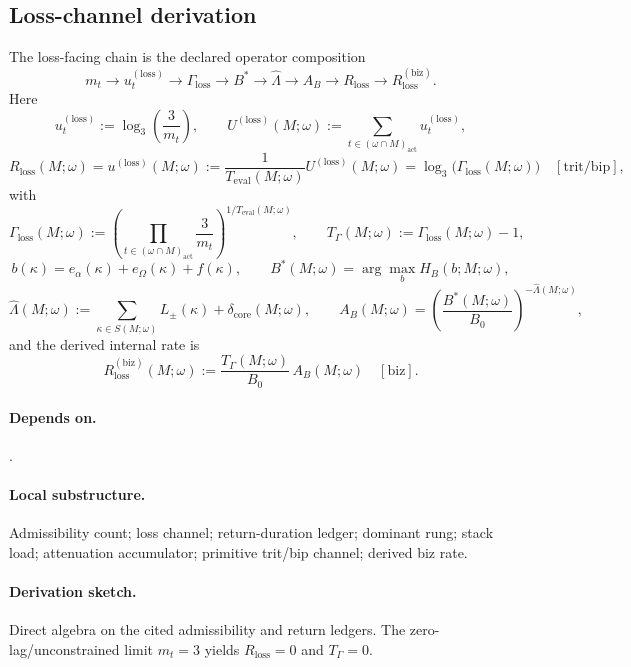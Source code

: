 \subsection{Loss-channel derivation}\label{subsec:native-rest-derivation}
\begin{definition}
\label{def:native-rest-derivation}
The loss-facing chain is the declared operator composition
\[
m_t\rightarrow u_t^{(\mathrm{loss})}\rightarrow \Gamma_{\mathrm{loss}}\rightarrow B^*\rightarrow \widehat\Lambda\rightarrow A_B\rightarrow R_{\mathrm{loss}}\rightarrow R_{\mathrm{loss}}^{(\mathrm{biz})}.
\]
Here
\[
u_t^{(\mathrm{loss})}:=\log_3\!\left(\frac{3}{m_t}\right),
\qquad
U^{(\mathrm{loss})}(M;\omega):=\sum_{t\in(\omega\cap M)_{\mathrm{act}}} u_t^{(\mathrm{loss})},
\]
\[
R_{\mathrm{loss}}(M;\omega)=u^{(\mathrm{loss})}(M;\omega):=\frac{1}{T_{\mathrm{eval}}(M;\omega)}U^{(\mathrm{loss})}(M;\omega)
=\log_3\!\bigl(\Gamma_{\mathrm{loss}}(M;\omega)\bigr)\quad[\mathrm{trit/bip}],
\]
with
\[
\Gamma_{\mathrm{loss}}(M;\omega):=\left(\prod_{t\in(\omega\cap M)_{\mathrm{act}}}\frac{3}{m_t}\right)^{1/T_{\mathrm{eval}}(M;\omega)},
\qquad
T_\Gamma(M;\omega):=\Gamma_{\mathrm{loss}}(M;\omega)-1,
\]
\[
b(\kappa)=e_{\alpha}(\kappa)+e_{\Omega}(\kappa)+f(\kappa),
\qquad
B^*(M;\omega)=\arg\max_b H_B(b;M;\omega),
\]
\[
\widehat\Lambda(M;\omega):=\sum_{\kappa\in S(M;\omega)}L_{\pm}(\kappa)+\delta_{\mathrm{core}}(M;\omega),
\qquad
A_B(M;\omega)=\left(\frac{B^*(M;\omega)}{B_0}\right)^{-\widehat\Lambda(M;\omega)},
\]
and the derived internal rate is
\[
R_{\mathrm{loss}}^{(\mathrm{biz})}(M;\omega):=\frac{T_\Gamma(M;\omega)}{B_0}\,A_B(M;\omega)
\quad[\mathrm{biz}].
\]
\end{definition}

\paragraph{Depends on.} .
\paragraph{Local substructure.} Admissibility count; loss channel; return-duration ledger; dominant rung; stack load; attenuation accumulator; primitive trit/bip channel; derived biz rate.
\paragraph{Derivation sketch.} Direct algebra on the cited admissibility and return ledgers. The zero-lag/unconstrained limit $m_t=3$ yields $R_{\mathrm{loss}}=0$ and $T_\Gamma=0$.

